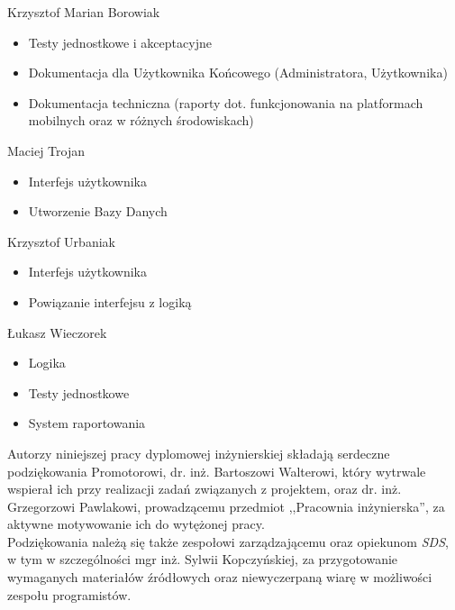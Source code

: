 \begin{description}
\item Krzysztof Marian Borowiak

\begin{itemize}
\item Testy jednostkowe i akceptacyjne
\item Dokumentacja dla Użytkownika Końcowego (Administratora, Użytkownika)
\item Dokumentacja techniczna (raporty dot. funkcjonowania na platformach mobilnych oraz w różnych środowiskach)
\end{itemize}
\noindent

\item Maciej Trojan

\begin{itemize}
\item Interfejs użytkownika
\item Utworzenie Bazy Danych
\end{itemize}
\noindent

\item Krzysztof Urbaniak

\begin{itemize}
\item Interfejs użytkownika
\item Powiązanie interfejsu z logiką
\end{itemize}
\noindent

\item Łukasz Wieczorek

\begin{itemize}
\item Logika
\item Testy jednostkowe
\item System raportowania
\end{itemize}
\noindent

\end{description}

Autorzy niniejszej pracy dyplomowej inżynierskiej składają serdeczne podziękowania Promotorowi, dr. inż. Bartoszowi Walterowi, który wytrwale wspierał ich przy realizacji zadań związanych z projektem, oraz dr. inż. Grzegorzowi Pawlakowi, prowadzącemu przedmiot ,,Pracownia inżynierska'', za aktywne motywowanie ich do wytężonej pracy. \\

Podziękowania należą się także zespołowi zarządzającemu oraz opiekunom \textit{SDS}, w tym w szczególności mgr inż. Sylwii Kopczyńskiej, za przygotowanie wymaganych materiałów źródłowych oraz niewyczerpaną wiarę w możliwości zespołu programistów.

